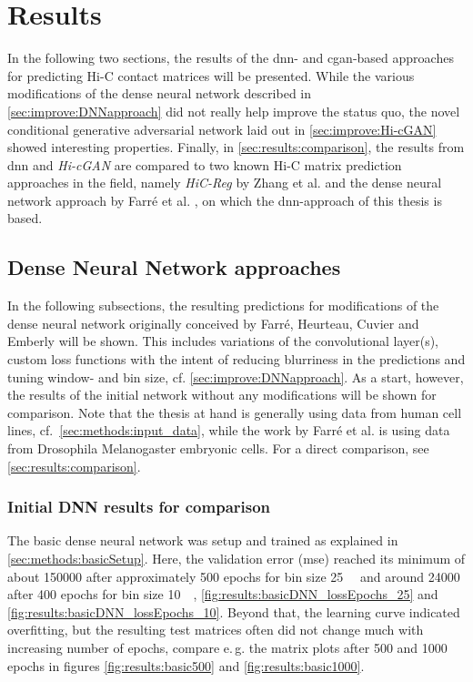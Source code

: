 \section{Results}
In the following two sections, 
the results of the \acrshort{dnn}- and \acrshort{cgan}-based approaches for predicting Hi-C contact matrices will be presented.
While the various modifications of the dense neural network described in \cref{sec:improve:DNNapproach} 
did  not really help improve the status quo, the novel conditional generative adversarial network laid out in \cref{sec:improve:Hi-cGAN}
showed interesting properties.
Finally, in \cref{sec:results:comparison}, the results from \acrshort{dnn} and \emph{Hi-cGAN} are compared to two known Hi-C matrix prediction approaches in the field,
namely \emph{HiC-Reg} by Zhang et al. \cite{Zhang2019} and the dense neural network approach by Farr\'e et al. \cite{Farre2018a},
on which the \acrshort{dnn}-approach of this thesis is based.

\subsection{Dense Neural Network approaches} \label{sec:results:DNN}
In the following subsections, the resulting predictions for modifications of the dense neural network originally conceived 
by Farr\'e, Heurteau, Cuvier and Emberly \cite{Farre2018a} will be shown. 
This includes variations of the convolutional layer(s), custom loss functions with the intent of reducing blurriness in the predictions
and tuning window- and bin size, cf. \cref{sec:improve:DNNapproach}.
As a start, however, the results of the initial network without any modifications will be shown for comparison.
Note that the thesis at hand is generally using data from human cell lines, cf.~\cref{sec:methods:input_data},
while the work by Farr\'e et al. is using data from Drosophila Melanogaster embryonic cells. 
For a direct comparison, see \cref{sec:results:comparison}.

\subsubsection{Initial DNN results for comparison} \label{sec:initialDNNresults}
The basic dense neural network was setup and trained as explained in \cref{sec:methods:basicSetup}.
Here, the validation error (\acrshort{mse}) reached its minimum of about \SI{150000}{} 
after approximately 500 epochs for bin size \SI{25}{\kilo\bp} and around \SI{24000}{} after 400 epochs for bin size \SI{10}{\kilo\bp}, \cref{fig:results:basicDNN_lossEpochs_25} and \ref{fig:results:basicDNN_lossEpochs_10}.
Beyond that, the learning curve indicated overfitting, but the resulting test matrices often did not change much with increasing number of epochs, 
compare e.\,g. the matrix plots after 500 and 1000 epochs in figures \ref{fig:results:basic500} and \ref{fig:results:basic1000}.

